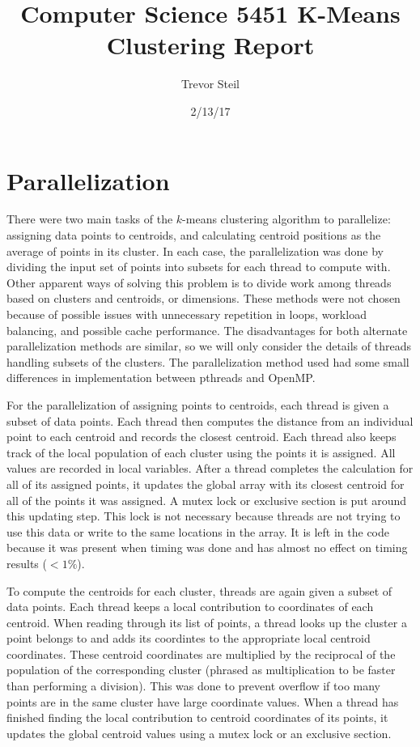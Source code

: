 \documentclass[a4paper]{article}
\title{Computer Science 5451 K-Means Clustering Report }
\date{2/13/17}
\author{Trevor Steil}
\begin{document}
\maketitle

\section{Parallelization}

There were two main tasks of the $k$-means clustering algorithm to parallelize: assigning data points to centroids, and calculating centroid positions
as the average of points in its cluster. In each case, the parallelization was done by dividing the input set of points into subsets for each thread
to compute with. Other apparent ways of solving this problem is to divide work among threads based on clusters and centroids, or dimensions. These
methods were not chosen because of possible issues with unnecessary repetition in loops, workload balancing, and possible cache performance. The
disadvantages for both alternate parallelization methods are similar, so we will only consider the details of threads handling subsets of the
clusters. The parallelization method used had some small differences in implementation between
pthreads and OpenMP.

For the parallelization of assigning points to centroids, each thread is given a subset of data points. Each thread then computes the distance from
an individual point to each centroid and records the closest centroid. Each thread also keeps track of the local population of each cluster using the
points it is assigned. All values are recorded in local variables. After a thread completes the calculation for all of its assigned points, it
updates the global array with its closest centroid for all of the points it was assigned. A mutex lock or exclusive section is put around this
updating step. This lock is not necessary because threads are
not trying to use this data or write to the same locations in the array. It is left in the code because it was present when timing was done and has
almost no effect on timing results ($<1\%$).

To compute the centroids for each cluster, threads
are again given a subset of data points. Each thread keeps a local contribution to coordinates of each centroid. When reading through its list of
points, a thread looks up the cluster a point belongs to and adds its coordintes to the appropriate local centroid coordinates. These centroid
coordinates are multiplied by the reciprocal of the population of the corresponding cluster (phrased as multiplication to be faster than performing a
division). This was done to prevent overflow if too many points are in the same cluster have large coordinate values. When a thread has finished
finding the local contribution to centroid coordinates of its points, it updates the global centroid values using a mutex lock or an exclusive
section.
\end{document}
